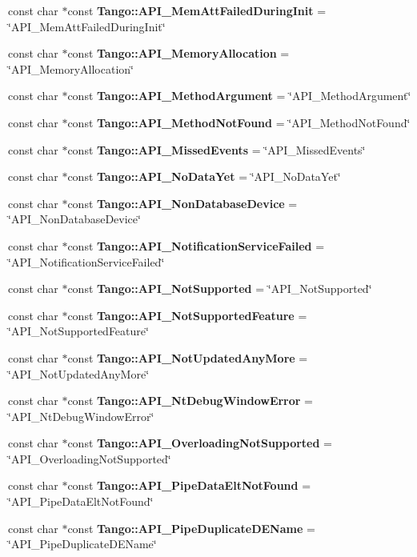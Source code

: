 \begin{DoxyCompactItemize}
const char $\ast$const {\bf Tango\-::\-A\-P\-I\-\_\-\-Mem\-Att\-Failed\-During\-Init} = \char`\"{}A\-P\-I\-\_\-\-Mem\-Att\-Failed\-During\-Init\char`\"{}
\item 
const char $\ast$const {\bf Tango\-::\-A\-P\-I\-\_\-\-Memory\-Allocation} = \char`\"{}A\-P\-I\-\_\-\-Memory\-Allocation\char`\"{}
\item 
const char $\ast$const {\bf Tango\-::\-A\-P\-I\-\_\-\-Method\-Argument} = \char`\"{}A\-P\-I\-\_\-\-Method\-Argument\char`\"{}
\item 
const char $\ast$const {\bf Tango\-::\-A\-P\-I\-\_\-\-Method\-Not\-Found} = \char`\"{}A\-P\-I\-\_\-\-Method\-Not\-Found\char`\"{}
\item 
const char $\ast$const {\bf Tango\-::\-A\-P\-I\-\_\-\-Missed\-Events} = \char`\"{}A\-P\-I\-\_\-\-Missed\-Events\char`\"{}
\item 
const char $\ast$const {\bf Tango\-::\-A\-P\-I\-\_\-\-No\-Data\-Yet} = \char`\"{}A\-P\-I\-\_\-\-No\-Data\-Yet\char`\"{}
\item 
const char $\ast$const {\bf Tango\-::\-A\-P\-I\-\_\-\-Non\-Database\-Device} = \char`\"{}A\-P\-I\-\_\-\-Non\-Database\-Device\char`\"{}
\item 
const char $\ast$const {\bf Tango\-::\-A\-P\-I\-\_\-\-Notification\-Service\-Failed} = \char`\"{}A\-P\-I\-\_\-\-Notification\-Service\-Failed\char`\"{}
\item 
const char $\ast$const {\bf Tango\-::\-A\-P\-I\-\_\-\-Not\-Supported} = \char`\"{}A\-P\-I\-\_\-\-Not\-Supported\char`\"{}
\item 
const char $\ast$const {\bf Tango\-::\-A\-P\-I\-\_\-\-Not\-Supported\-Feature} = \char`\"{}A\-P\-I\-\_\-\-Not\-Supported\-Feature\char`\"{}
\item 
const char $\ast$const {\bf Tango\-::\-A\-P\-I\-\_\-\-Not\-Updated\-Any\-More} = \char`\"{}A\-P\-I\-\_\-\-Not\-Updated\-Any\-More\char`\"{}
\item 
const char $\ast$const {\bf Tango\-::\-A\-P\-I\-\_\-\-Nt\-Debug\-Window\-Error} = \char`\"{}A\-P\-I\-\_\-\-Nt\-Debug\-Window\-Error\char`\"{}
\item 
const char $\ast$const {\bf Tango\-::\-A\-P\-I\-\_\-\-Overloading\-Not\-Supported} = \char`\"{}A\-P\-I\-\_\-\-Overloading\-Not\-Supported\char`\"{}
\item 
const char $\ast$const {\bf Tango\-::\-A\-P\-I\-\_\-\-Pipe\-Data\-Elt\-Not\-Found} = \char`\"{}A\-P\-I\-\_\-\-Pipe\-Data\-Elt\-Not\-Found\char`\"{}
\item 
const char $\ast$const {\bf Tango\-::\-A\-P\-I\-\_\-\-Pipe\-Duplicate\-D\-E\-Name} = \char`\"{}A\-P\-I\-\_\-\-Pipe\-Duplicate\-D\-E\-Name\char`\"{}

\end{DoxyCompactItemize}
